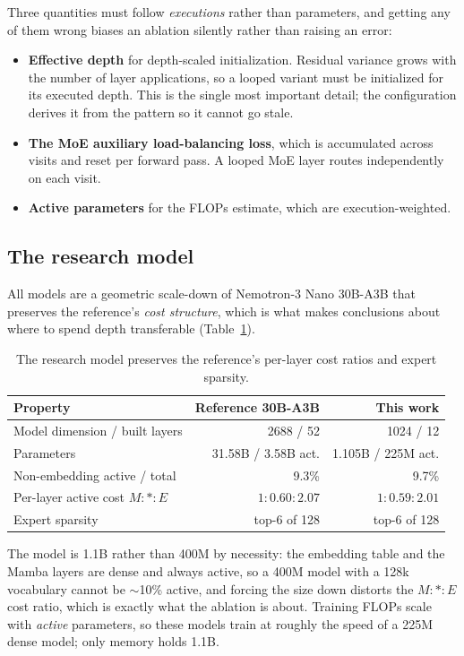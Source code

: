 \documentclass[11pt,a4paper]{article}
\begin{document}
Three quantities must follow \emph{executions} rather than parameters, and getting any of them
wrong biases an ablation silently rather than raising an error:
\begin{itemize}
  \item \textbf{Effective depth} for depth-scaled initialization. Residual variance grows with the
    number of layer applications, so a looped variant must be initialized for its executed depth.
    This is the single most important detail; the configuration derives it from the pattern so it
    cannot go stale.
  \item \textbf{The MoE auxiliary load-balancing loss}, which is accumulated across visits and
    reset per forward pass. A looped MoE layer routes independently on each visit.
  \item \textbf{Active parameters} for the FLOPs estimate, which are execution-weighted.
\end{itemize}

\subsection{The research model}

All models are a geometric scale-down of Nemotron-3 Nano 30B-A3B that preserves the reference's
\emph{cost structure}, which is what makes conclusions about where to spend depth transferable
(Table~\ref{tab:scaledown}).

\begin{table}[h]
\centering
\begin{tabular}{lrr}
\toprule
Property & Reference 30B-A3B & This work \\
\midrule
Model dimension / built layers      & 2688 / 52          & 1024 / 12 \\
Parameters                          & 31.58B / 3.58B act.& 1.105B / 225M act. \\
Non-embedding active / total        & 9.3\%              & 9.7\% \\
Per-layer active cost $M : * : E$   & $1 : 0.60 : 2.07$  & $1 : 0.59 : 2.01$ \\
Expert sparsity                     & top-6 of 128       & top-6 of 128 \\
\bottomrule
\end{tabular}
\caption{The research model preserves the reference's per-layer cost ratios and expert sparsity.}
\label{tab:scaledown}
\end{table}

The model is 1.1B rather than 400M by necessity: the embedding table and the Mamba layers are dense
and always active, so a 400M model with a 128k vocabulary cannot be $\sim$10\% active, and forcing
the size down distorts the $M : * : E$ cost ratio, which is exactly what the ablation is about.
Training FLOPs scale with \emph{active} parameters, so these models train at roughly the speed of a
225M dense model; only memory holds 1.1B.
\end{document}
